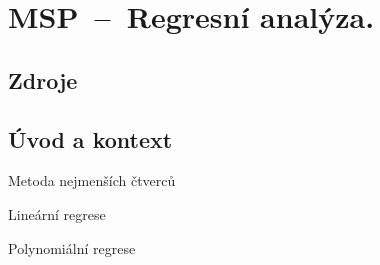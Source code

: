 

\graphicspath{{msp/regresni_analyza/figures}}


\chapter{MSP~--~Regresní analýza.}


\section{Zdroje}

\begin{compactitem}
    \item {}
\end{compactitem}


\section{Úvod a kontext}

Metoda nejmenších čtverců

Lineární regrese

Polynomiální regrese
